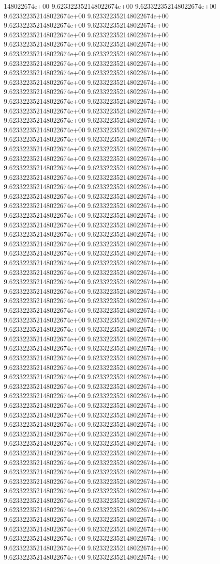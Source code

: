 148022674e+00	9.623322352148022674e+00	9.623322352148022674e+00	9.623322352148022674e+00	9.623322352148022674e+00	9.623322352148022674e+00	9.623322352148022674e+00	9.623322352148022674e+00	9.623322352148022674e+00	9.623322352148022674e+00	9.623322352148022674e+00	9.623322352148022674e+00	9.623322352148022674e+00	9.623322352148022674e+00	9.623322352148022674e+00	9.623322352148022674e+00	9.623322352148022674e+00	9.623322352148022674e+00	9.623322352148022674e+00	9.623322352148022674e+00	9.623322352148022674e+00	9.623322352148022674e+00	9.623322352148022674e+00	9.623322352148022674e+00	9.623322352148022674e+00	9.623322352148022674e+00	9.623322352148022674e+00	9.623322352148022674e+00	9.623322352148022674e+00	9.623322352148022674e+00	9.623322352148022674e+00	9.623322352148022674e+00	9.623322352148022674e+00	9.623322352148022674e+00	9.623322352148022674e+00	9.623322352148022674e+00	9.623322352148022674e+00	9.623322352148022674e+00	9.623322352148022674e+00	9.623322352148022674e+00	9.623322352148022674e+00	9.623322352148022674e+00	9.623322352148022674e+00	9.623322352148022674e+00	9.623322352148022674e+00	9.623322352148022674e+00	9.623322352148022674e+00	9.623322352148022674e+00	9.623322352148022674e+00	9.623322352148022674e+00	9.623322352148022674e+00	9.623322352148022674e+00	9.623322352148022674e+00	9.623322352148022674e+00	9.623322352148022674e+00	9.623322352148022674e+00	9.623322352148022674e+00	9.623322352148022674e+00	9.623322352148022674e+00	9.623322352148022674e+00	9.623322352148022674e+00	9.623322352148022674e+00	9.623322352148022674e+00	9.623322352148022674e+00	9.623322352148022674e+00	9.623322352148022674e+00	9.623322352148022674e+00	9.623322352148022674e+00	9.623322352148022674e+00	9.623322352148022674e+00	9.623322352148022674e+00	9.623322352148022674e+00	9.623322352148022674e+00	9.623322352148022674e+00	9.623322352148022674e+00	9.623322352148022674e+00	9.623322352148022674e+00	9.623322352148022674e+00	9.623322352148022674e+00	9.623322352148022674e+00	9.623322352148022674e+00	9.623322352148022674e+00	9.623322352148022674e+00	9.623322352148022674e+00	9.623322352148022674e+00	9.623322352148022674e+00	9.623322352148022674e+00	9.623322352148022674e+00	9.623322352148022674e+00	9.623322352148022674e+00	9.623322352148022674e+00	9.623322352148022674e+00	9.623322352148022674e+00	9.623322352148022674e+00	9.623322352148022674e+00	9.623322352148022674e+00	9.623322352148022674e+00	9.623322352148022674e+00	9.623322352148022674e+00	9.623322352148022674e+00	9.623322352148022674e+00	9.623322352148022674e+00	9.623322352148022674e+00	9.623322352148022674e+00	9.623322352148022674e+00	9.623322352148022674e+00	9.623322352148022674e+00	9.623322352148022674e+00	9.623322352148022674e+00	9.623322352148022674e+00	9.623322352148022674e+00	9.623322352148022674e+00	9.623322352148022674e+00	9.623322352148022674e+00	9.623322352148022674e+00	9.623322352148022674e+00	9.623322352148022674e+00	9.623322352148022674e+00	9.623322352148022674e+00
